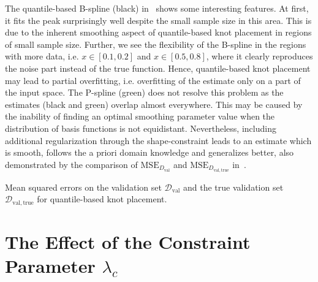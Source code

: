 The quantile-based B-spline (black) in~ shows some interesting features. At first, it fits the peak surprisingly well despite the small sample size in this area. This is due to the inherent smoothing aspect of quantile-based knot placement in regions of small sample size. Further, we see the flexibility of the B-spline in the regions with more data, i.e. $x\in[0.1,0.2]$ and $x \in [0.5,0.8]$, where it clearly reproduces the noise part instead of the true function. Hence, quantile-based knot placement may lead to partial overfitting, i.e. overfitting of the estimate only on a part of the input space. The P-spline (green) does not resolve this problem as the estimates (black and green) overlap almost everywhere. This may be caused by the inability of finding an optimal smoothing parameter value when the distribution of basis functions is not equidistant. Nevertheless, including additional regularization through the shape-constraint leads to an estimate which is smooth, follows the a priori domain knowledge and generalizes better, also demonstrated by the comparison of $\text{MSE}_{D_{\mathrm{val}}}$ and $\text{MSE}_{D_{\mathrm{val}, \mathrm{true}}}$ in~.


\begin{table}[H]
	\begin{center}
	\end{center}
	\caption{Mean squared errors on the validation set $\mathcal{D}_{\mathrm{val}}$ and the true validation set $\mathcal{D}_{\mathrm{val},\mathrm{true}}$ for quantile-based knot placement.}
	\label{tab:sparse-example-quantile}
\end{table}



\section{The Effect of the Constraint Parameter $\lambda_c$} \label{sec:lambda_c_sec}

